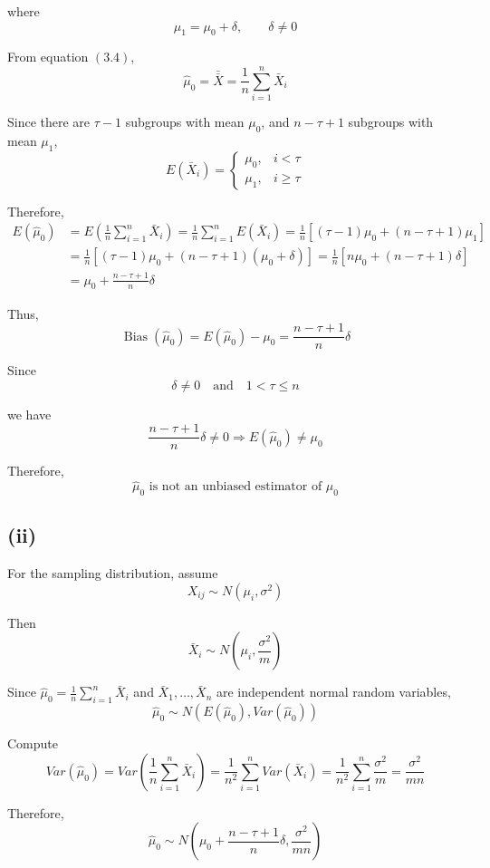 \documentclass[a4paper, 12pt]{article}  %
\begin{document}
where
$$
\mu_1=\mu_0+\delta,\qquad \delta\neq 0
$$

From equation \((3.4)\),
$$
\hat{\mu}_0=\bar{\bar X}=\frac{1}{n}\sum_{i=1}^{n}\bar X_i
$$

Since there are \(\tau-1\) subgroups with mean \(\mu_0\), and \(n-\tau+1\) subgroups with mean \(\mu_1\),
$$
E(\bar X_i)=
\begin{cases}
\mu_0, & i<\tau \\
\mu_1, & i\ge \tau
\end{cases}
$$

Therefore,
\begin{align*}
E(\hat{\mu}_0)
&=E\left(\frac{1}{n}\sum_{i=1}^{n}\bar X_i\right) 
=\frac{1}{n}\sum_{i=1}^{n}E(\bar X_i)
=\frac{1}{n}\left[(\tau-1)\mu_0+(n-\tau+1)\mu_1\right] \\
&=\frac{1}{n}\left[(\tau-1)\mu_0+(n-\tau+1)(\mu_0+\delta)\right]
=\frac{1}{n}\left[n\mu_0+(n-\tau+1)\delta\right] \\
&=\mu_0+\frac{n-\tau+1}{n}\delta
\end{align*}

Thus,
$$
\operatorname{Bias}(\hat{\mu}_0)=E(\hat{\mu}_0)-\mu_0=\frac{n-\tau+1}{n}\delta
$$

Since
$$
\delta\neq 0
\quad\text{and}\quad
1<\tau\le n
$$

we have
$$
\frac{n-\tau+1}{n}\delta\neq 0\Rightarrow E(\hat{\mu}_0)\neq \mu_0
$$

Therefore,
$$
\hat{\mu}_0\text{ is not an unbiased estimator of }\mu_0
$$

\subsection*{(ii)}
For the sampling distribution, assume
$$
X_{ij}\sim N(\mu_i,\sigma^2)
$$

Then
$$
\bar X_i\sim N\left(\mu_i,\frac{\sigma^2}{m}\right)
$$

Since $\hat{\mu}_0=\frac{1}{n}\sum_{i=1}^{n}\bar X_i$ and \(\bar X_1,\ldots,\bar X_n\) are independent normal random variables,
$$
\hat{\mu}_0\sim N\left(E(\hat{\mu}_0),Var(\hat{\mu}_0)\right)
$$

Compute
$$
Var(\hat{\mu}_0)=Var\left(\frac{1}{n}\sum_{i=1}^{n}\bar X_i\right)
=\frac{1}{n^2}\sum_{i=1}^{n}Var(\bar X_i)
=\frac{1}{n^2}\sum_{i=1}^{n}\frac{\sigma^2}{m}
=\frac{\sigma^2}{mn}
$$

Therefore,
$$
\hat{\mu}_0\sim N\left(\mu_0+\frac{n-\tau+1}{n}\delta,\frac{\sigma^2}{mn}\right)
$$
    
\end{document}
